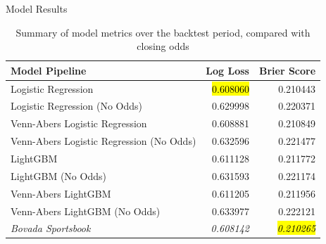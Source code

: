 \documentclass[aspectratio=169,xcolor=dvipsnames]{beamer}
\begin{document}
\begin{frame}{Model Results}
    \begin{table}[]
    \begin{tabular}{@{}lrr@{}}
    \toprule
    Model Pipeline                           & Log Loss          & Brier Score       \\ \midrule
    Logistic Regression                      & \hl{0.608060} & 0.210443 \\
    Logistic Regression (No Odds)            & 0.629998          & 0.220371          \\
    Venn-Abers Logistic Regression           & 0.608881          & 0.210849          \\
    Venn-Abers Logistic Regression (No Odds) & 0.632596          & 0.221477          \\
    LightGBM                                 & 0.611128          & 0.211772          \\
    LightGBM (No Odds)                       & 0.631593          & 0.221174          \\
    Venn-Abers LightGBM                      & 0.611205          & 0.211956          \\
    Venn-Abers LightGBM (No Odds)            & 0.633977          & 0.222121          \\ \midrule
    \textit{Bovada Sportsbook}               & \textit{0.608142} & \hl{\textit{0.210265}} \\ \bottomrule
    \end{tabular}
    \caption{Summary of model metrics over the backtest period, compared with closing odds}
    \end{table}
\end{frame}

\end{document}
